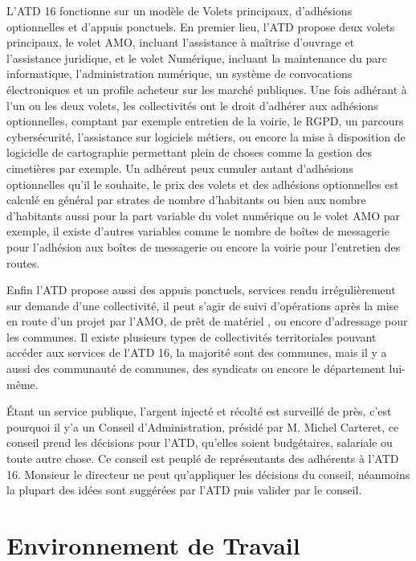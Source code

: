 \documentclass[a4paper,12pt]{report}
\begin{document}
L'ATD 16 fonctionne sur un modèle de Volets principaux, d'adhésions optionnelles et d'appuis ponctuels. En premier lieu, l'ATD propose deux volets principaux, le volet AMO, incluant l'assistance à maîtrise d'ouvrage et l'assistance juridique, et le volet Numérique, incluant la maintenance du parc informatique, l'administration numérique, un système de convocations électroniques et un profile acheteur sur les marché publiques. Une fois adhérant à l'un ou les deux volets, les collectivités ont le droit d'adhérer aux adhésions optionnelles, comptant par exemple entretien de la voirie, le RGPD, un parcours cybersécurité, l'assistance sur logiciels métiers, ou encore la mise à disposition de logicielle de cartographie permettant plein de choses comme la gestion des cimetières par exemple. Un adhérent peux cumuler autant d'adhésions optionnelles qu'il le souhaite, le prix des volets et des adhésions optionnelles est calculé en général par strates de nombre d'habitants ou bien aux nombre d'habitants aussi pour la part variable du volet numérique ou le volet AMO par exemple, il existe d'autres variables comme le nombre de boîtes de messagerie pour l'adhésion aux boîtes de messagerie ou encore la voirie pour l'entretien des routes.

Enfin l'ATD propose aussi des appuis ponctuels, services rendu irrégulièrement sur demande d'une collectivité, il peut s'agir de suivi d'opérations après la mise en route d'un projet par l'AMO, de prêt de matériel , ou encore d'adressage pour les communes. Il existe plusieurs types de collectivités territoriales pouvant accéder aux services de l'ATD 16, la majorité sont des communes, mais il y a aussi des communauté de communes, des syndicats ou encore le département lui-même.

Étant un service publique, l'argent injecté et récolté est surveillé de près, c'est pourquoi il y'a un Conseil d'Administration, présidé par M. Michel Carteret, ce conseil prend les décisions pour l'ATD, qu'elles soient budgétaires, salariale ou toute autre chose. Ce conseil est peuplé de représentants des adhérents à l'ATD 16. Monsieur le directeur ne peut qu'appliquer les décisions du conseil, néanmoins la plupart des idées sont suggérées par l'ATD puis valider par le conseil.

\section{Environnement de Travail}
\end{document}
